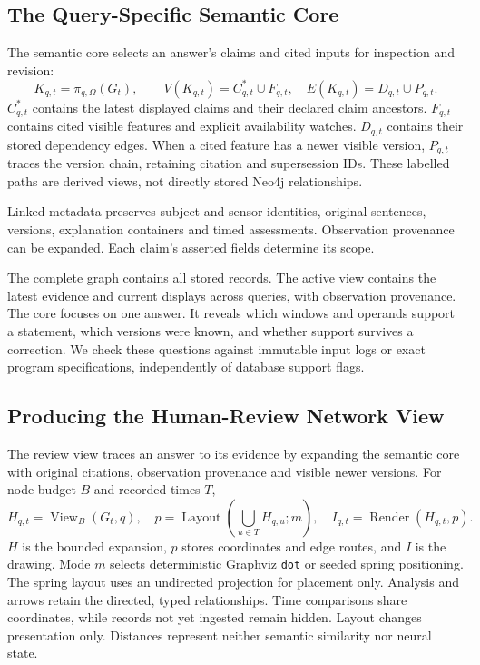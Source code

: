 \documentclass[runningheads]{llncs}
\begin{document}
\subsection{The Query-Specific Semantic Core}

The semantic core selects an answer's claims and cited inputs for inspection
and revision:
\begin{equation}
 K_{q,t}=\pi_{q,\Omega}(G_t),\qquad
 V(K_{q,t})=C_{q,t}^{*}\cup F_{q,t},\quad
 E(K_{q,t})=D_{q,t}\cup P_{q,t}.
\label{eq:core}
\end{equation}
$C_{q,t}^{*}$ contains the latest displayed claims and their declared claim
ancestors. $F_{q,t}$ contains cited visible features and explicit availability
watches. $D_{q,t}$ contains their stored dependency edges.
When a cited feature has a newer visible version, $P_{q,t}$ traces the version
chain, retaining citation and supersession IDs. These labelled paths are
derived views, not directly stored Neo4j relationships.

Linked metadata preserves subject and sensor identities, original sentences,
versions, explanation containers and timed assessments.
Observation provenance can be expanded. Each claim's asserted fields
determine its scope.

The complete graph contains all stored records. The active view contains
the latest evidence and current displays across queries, with observation
provenance. The core focuses on one answer. It reveals which windows and
operands support a statement, which versions were known, and whether support
survives a correction. We check these questions against immutable input logs
or exact program specifications, independently of database support flags.





\subsection{Producing the Human-Review Network View}
\label{sec:reviewview}

The review view traces an answer to its evidence by expanding the semantic
core with original citations, observation provenance and visible newer
versions. For node budget $B$ and recorded times $T$,
\begin{equation}
 H_{q,t}=\operatorname{View}_B(G_t,q),\quad
 p=\operatorname{Layout}\!\left(\bigcup_{u\in T}H_{q,u};m\right),\quad
 I_{q,t}=\operatorname{Render}(H_{q,t},p).
\label{eq:reviewview}
\end{equation}
$H$ is the bounded expansion, $p$ stores coordinates and edge routes,
and $I$ is the drawing. Mode $m$ selects deterministic Graphviz \texttt{dot}
or seeded spring positioning. The spring layout uses an undirected
projection for placement only. Analysis and arrows retain the directed,
typed relationships. Time comparisons share coordinates, while records
not yet ingested remain hidden. Layout changes presentation only.
Distances represent neither semantic similarity nor neural state.
\end{document}
